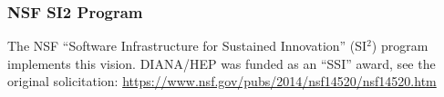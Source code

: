 \begin{frame}
\frametitle{NSF SI2 Program}

The NSF ``Software Infrastructure for Sustained Innovation'' (SI$^2$) program implements this vision. 
\vskip 0.15in
DIANA/HEP was funded as an ``SSI'' award, see the original solicitation:
\vskip 0.15in
\small{\url{https://www.nsf.gov/pubs/2014/nsf14520/nsf14520.htm}}
\end{frame}


